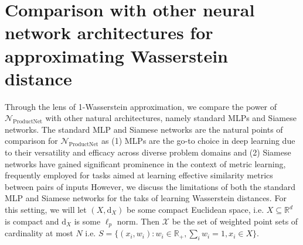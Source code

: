 \documentclass[12pt]{article}
\newcommand{\R}{\mathbb R}
\newcommand{\Network}{\mathcal{N}_{\mathrm{ProductNet}}}
\newcommand{\SFGI} {{SFGI}}
\begin{document}
\section{Comparison with other 
neural network architectures for approximating Wasserstein distance} 
\label{subsec:comparisonNNs}
Through the lens of 1-Wasserstein approximation, we compare the power of $\Network$ with other natural architectures, namely standard MLPs and Siamese networks. The standard MLP and Siamese networks are the natural points of comparison for $\Network$ as (1) MLPs are the go-to choice in deep learning due to their versatility and efficacy across diverse problem domains and (2) Siamese networks have gained significant prominence in the context of metric learning, frequently employed for tasks aimed at learning effective similarity metrics between pairs of inputs\citep{hadsell2006dimensionality, bromley1993signature, koch2015siamese}
However, we discuss the limitations of both the standard MLP and Siamese networks for the taks of learning Wasserstein distances. For this setting, we will let $(X, \mathrm{d}_X)$ be some compact Euclidean space, i.e. $X \subseteq \R^d$ is compact and $\mathrm{d}_X$ is some $\ell_p$ norm.
Then $\mathcal{X}$ be the set of weighted point sets of cardinality at most $N$ i.e. $S = \{(x_i, w_i) : w_i \in \R_+, \sum_i w_i = 1, x_i \in X\}$. 

\end{document}
